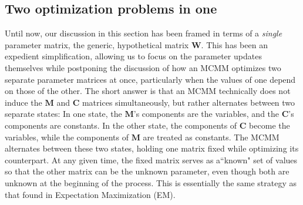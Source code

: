 



\subsection{Two optimization problems in one}

Until now, our discussion in this section has been framed in terms of a 
\emph{single} parameter matrix, the generic, hypothetical matrix $\textbf{W}$. This has been an expedient simplification, 
allowing us to focus on the parameter updates themselves while postponing 
the discussion of how an MCMM optimizes two separate parameter matrices
at once, particularly when the values of one depend on those of the other.
The short answer is that an MCMM technically does not induce the $\textbf{M}$ and $\textbf{C}$ matrices simultaneously, but rather alternates between two separate states: In one state, the $\textbf{M}$'s components are the variables, and the $\textbf{C}$'s components are constants. In the other state, the components of $\textbf{C}$ become the variables, while the components of $\textbf{M}$ are treated as constants. The MCMM alternates between these two states, holding one matrix fixed while optimizing its counterpart. At any given time, the fixed matrix serves as a``known" set of values so that the other matrix can be the unknown parameter, even though both are unknown at the beginning of the process. This is essentially the same strategy as that found in Expectation Maximization (EM).


